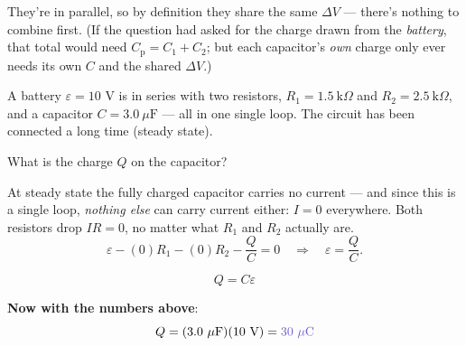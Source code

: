\documentclass[12pt]{article}
\newcommand{\ANS}[1]{\textcolor{accent}{#1}}
\newcommand{\battv}[1]{%
  \draw[line width=0.7pt] ($(#1)+(0,0.55)$) -- ($(#1)+(0,0.12)$);
  \draw[line width=0.7pt] ($(#1)+(0,-0.12)$) -- ($(#1)+(0,-0.55)$);
  \draw[line width=1.1pt] ($(#1)+(-0.35,0.12)$) -- ($(#1)+(0.35,0.12)$);
  \draw[line width=2.4pt] ($(#1)+(-0.2,-0.12)$) -- ($(#1)+(0.2,-0.12)$);
  \node[scale=0.75] at ($(#1)+(0.6,0.12)$) {$+$};
  \node[scale=0.75] at ($(#1)+(0.6,-0.12)$) {$-$};
}
\newcommand{\reszig}[1]{%
  \fill[white] ($(#1)+(-0.65,-0.32)$) rectangle ($(#1)+(0.65,0.32)$);
  \draw ($(#1)+(-0.6,0)$)
    -- ($(#1)+(-0.42,0.22)$) -- ($(#1)+(-0.24,-0.22)$)
    -- ($(#1)+(-0.06,0.22)$) -- ($(#1)+(0.12,-0.22)$)
    -- ($(#1)+(0.3,0.22)$) -- ($(#1)+(0.48,-0.22)$)
    -- ($(#1)+(0.6,0)$);
}
\newcommand{\capsymv}[1]{%
  \fill[white] ($(#1)+(-0.4,-0.35)$) rectangle ($(#1)+(0.4,0.35)$);
  \draw[line width=0.7pt] ($(#1)+(0,-0.35)$) -- ($(#1)+(0,-0.1)$);
  \draw[line width=0.7pt] ($(#1)+(0,0.1)$) -- ($(#1)+(0,0.35)$);
  \draw[line width=1.8pt] ($(#1)+(-0.3,-0.1)$) -- ($(#1)+(0.3,-0.1)$);
  \draw[line width=1.8pt] ($(#1)+(-0.3,0.1)$) -- ($(#1)+(0.3,0.1)$);
}
\begin{document}

{\small\color{accent} They're in parallel, so by definition they share the
same $\Delta V$ --- there's nothing to combine first. (If the question had
asked for the charge drawn from the \emph{battery}, that total would need
$C_{\text{p}}=C_1+C_2$; but each capacitor's \emph{own} charge only ever
needs its own $C$ and the shared $\Delta V$.)}

\clearpage

A battery $\varepsilon=10$ V is in series with two resistors,
$R_1=1.5\ \text{k}\Omega$ and $R_2=2.5\ \text{k}\Omega$, and a capacitor
$C=3.0\ \mu\text{F}$ --- all in one single loop. The circuit has been
connected a long time (steady state).

\begin{center}
\end{center}

What is the charge $Q$ on the capacitor?

{\small
At steady state the fully charged capacitor carries no current --- and
since this is a single loop, \emph{nothing else} can carry current either:
$I=0$ everywhere. Both resistors drop $IR=0$, no matter what $R_1$ and
$R_2$ actually are.
\[
\varepsilon - (0)R_1 - (0)R_2 - \dfrac{Q}{C} = 0 \quad\Longrightarrow\quad
\varepsilon = \dfrac{Q}{C}.
\]}

\[
\boxed{Q = C\varepsilon}
\]

\textbf{Now with the numbers above}:
\[
Q = (3.0\ \mu\text{F})(10\text{ V}) = \ANS{30\ \mu\text{C}}
\]

\end{document}
